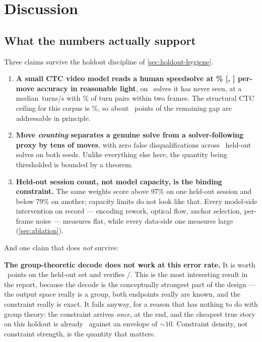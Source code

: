 \section{Discussion}
\label{sec:discussion}

\subsection{What the numbers actually support}

Three claims survive the holdout discipline of \cref{sec:holdout-hygiene}.

\begin{enumerate}[leftmargin=1.4em,itemsep=3pt]
\item \textbf{A small CTC video model reads a human speedsolve at
\CIDayMean\% [\CIDayLo, \CIDayHi] per-move accuracy in reasonable light}, on
\NHoldoutSolves\ solves it has never seen, at a median
\MedianTPS\,turns/s with \CrowdedPctHoldout\% of turn pairs within two frames.
The structural CTC ceiling for this corpus is \CTCCeilingHoldout\%, so about
\RemainingGap\ points of the remaining gap are addressable in principle.
\item \textbf{Move \emph{counting} separates a genuine solve from a
solver-following proxy by tens of moves}, with zero false disqualifications
across \ACSolves\ held-out solves on both seeds. Unlike everything else here,
the quantity being thresholded is bounded by a theorem.
\item \textbf{Held-out session count, not model capacity, is the binding
constraint.} The same weights score above 97\% on one held-out session and
below 79\% on another; capacity limits do not look like that. Every
model-side intervention on record --- encoding rework, optical flow, anchor
selection, per-frame noise --- measures flat, while every data-side one
measures large (\cref{sec:ablation}).
\end{enumerate}

And one claim that does \emph{not} survive:

\begin{keybox}
\textbf{The group-theoretic decode does not work at this error rate.} It is
worth \DecodeGain\ points on the held-out set and verifies
\DecodeVerified/\DecodeTrials. This is the most interesting result in the
report, because the decode is the conceptually strongest part of the design
--- the output space really is a group, both endpoints really are known, and
the constraint really is exact. It fails anyway, for a reason that has
nothing to do with group theory: the constraint arrives \emph{once}, at the
end, and the cheapest true story on this holdout is already
\MinGtPathCost\ against an envelope of ${\sim}10$. Constraint density, not
constraint strength, is the quantity that matters.
\end{keybox}

